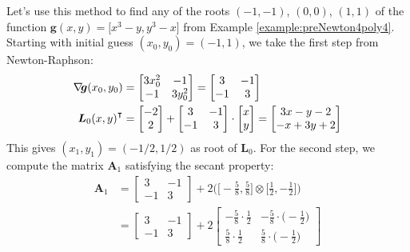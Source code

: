 \begin{example}\label{example:SecantPoly4}
Let's use this method to find any of the roots $(-1,-1)$, $(0,0)$, $(1,1)$ of the function $\boldsymbol{g}(x,y) = \big[ x^3-y, y^3 - x \big]$ from Example \ref{example:preNewton4poly4}.
Starting with initial guess $(x_0, y_0) = (-1, 1)$, we take the first step from Newton-Raphson:
\begin{align*}
\mathop{\nabla\! {\boldsymbol{g}}}(x_0, y_0) &= \begin{bmatrix} 3x_0^2 & -1 \\ -1 & 3y_0^2 \end{bmatrix} =  \begin{bmatrix} 3 & -1 \\ -1 & 3 \end{bmatrix} \\
{\boldsymbol{L}_0 (x, y)}^\intercal &= \begin{bmatrix} -2 \\ 2 \end{bmatrix} + \begin{bmatrix} 3 & -1 \\ -1 & 3 \end{bmatrix} \cdot \begin{bmatrix} x \\ y \end{bmatrix} = \begin{bmatrix} 3x -y -2 \\ -x+3y +2 \end{bmatrix}
\end{align*}
This gives $(x_1, y_1) = (-1/2, 1/2)$ as root of $\boldsymbol{L}_0$.  For the second step, we compute the matrix $\boldsymbol{A}_1$ satisfying the secant property:
\begin{align*}
\boldsymbol{A}_1 &= \begin{bmatrix} 3 & -1 \\ -1 & 3 \end{bmatrix} + 2 \big( \big[ -\tfrac{5}{8}, \tfrac{5}{8} \big] \otimes \big[ \tfrac{1}{2}, -\tfrac{1}{2} \big] \big) \\
&= \begin{bmatrix} 3 & -1 \\ -1 & 3 \end{bmatrix} + 2 \begin{bmatrix} -\tfrac{5}{8} \cdot \tfrac{1}{2} & -\tfrac{5}{8}\cdot \big( -\tfrac{1}{2} \big) \\ \tfrac{5}{8} \cdot \tfrac{1}{2} & \tfrac{5}{8} \cdot \big(- \tfrac{1}{2} \big) \end{bmatrix} \\

\end{align*}
\end{example}
